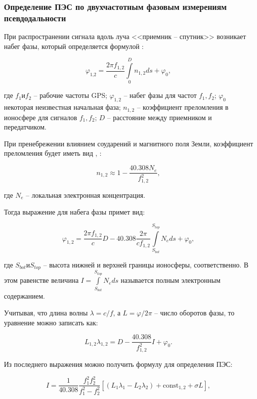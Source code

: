 \documentclass[14pt]{article}
\begin{document}
\subsubsection{Определение ПЭС по двухчастотным фазовым измерениям псевдодальности}
При распространении сигнала вдоль луча <<приемник -- спутник>> возникает набег фазы, который определяется формулой \cite{devis}:

\begin{equation}
\varphi_\text{1,2} = \frac{2\pi f_{1,2}}{c} \int\limits_{0}^{D}n_{1,2}ds + \varphi_0,
\end{equation}

где $f_1 \text{и}  f_2$ -- рабочие частоты GPS; $\varphi_{1,2}$ -- набег фазы для частот $f_1, f_2$; $\varphi_0$ некоторая неизвестная начальная фаза; $n_{1,2}$ -- коэффициент преломления в ионосфере для сигналов $f_1, f_2$; $D$ -- расстояние между приемником и передатчиком.

При пренебрежении влиянием соударений и магнитного поля Земли, коэффициент преломления будет иметь вид \cite{devis}, \cite{ratcliff}:

\begin{equation}
\label{n_equ}
n_{1,2} \approx 1 - \frac{40.308N_e}{f_{1,2}^2},
\end{equation}

где $N_e$ -- локальная электронная концентрация.

Тогда выражение для набега фазы примет вид:

\begin{equation}
\varphi_{1,2} = \frac{2\pi f_{1,2}}{c}D - 40.308\frac{2\pi}{c f_{1,2}}\int\limits_{S_{bot}}^{S_{top}}N_e ds + \varphi_0,
\end{equation}

где $S_{bot} \text{и} S_{top}$ -- высота нижней и верхней границы ионосферы, соответственно. В этом равенстве величина $I = \int\limits_{S_{bot}}^{S_{top}}N_eds$ называется полным электронным содержанием.

Учитывая, что длина волны $\lambda = c / f$, а $L = \varphi / 2\pi$ -- число оборотов фазы, то уравнение можно записать как:

\begin{equation}
L_{1,2} \lambda_{1,2} = D - \frac{40.308}{f_{1,2}^2}I + \varphi_0.
\end{equation}

Из последнего выражения можно получить формулу для определения ПЭС:

\begin{equation}
\label{tecF}
I = \frac{1}{40.308}\frac{f_1^2 f_2^2}{f_1^2 - f_2^2} \left[ \left( L_1\lambda_1 - L_2\lambda_2 \right) + \text{const}_{1,2} + \sigma L \right],
\end{equation}
\end{document}
